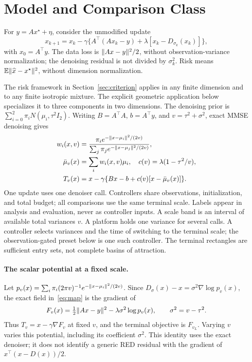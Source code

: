 \section{Model and Comparison Class}\label{sec:model}
For $y=Ax^\star+\eta$, consider the unmodified update
\begin{equation}\label{eq:red}
 x_{k+1}=x_k-\gamma\{A^\top(Ax_k-y)+\lambda[x_k-D_{\sigma_k}(x_k)]\},
\end{equation}
with $x_0=A^\top y$. The data loss is $\lVert Ax-y\rVert^2/2$, without observation-variance normalization; the denoising residual is not divided by $\sigma_k^2$. Risk means $\mathbb E\lVert\widehat x-x^\star\rVert^2$, without dimension normalization.

The risk framework in Section~\ref{sec:criterion} applies in any
finite dimension and to any finite isotropic mixture. The explicit
geometric application below specializes it to three components in two
dimensions. The denoising prior is $\sum_{i=0}^2\pi_iN(\mu_i,\tau^2I_2)$. Writing $B=A^\top A$, $b=A^\top y$, and $v=\tau^2+\sigma^2$, exact MMSE denoising gives
\begin{align}
w_i(x,v)&=\frac{\pi_i e^{-\lVert x-\mu_i\rVert^2/(2v)}}{\sum_j\pi_j e^{-\lVert x-\mu_j\rVert^2/(2v)}},\\
\bar\mu_v(x)&=\sum_iw_i(x,v)\mu_i,\quad c(v)=\lambda(1-\tau^2/v),\\
T_v(x)&=x-\gamma\{Bx-b+c(v)[x-\bar\mu_v(x)]\}.\label{eq:map}
\end{align}
One update uses one denoiser call. Controllers share observations, initialization, and total budget; all comparisons use the same terminal scale. Labels appear in analysis and evaluation, never as controller inputs. A scale band is an interval of available total variances $v$. A platform holds one variance for several calls. A controller selects variances and the time of switching to the terminal scale; the observation-gated preset below is one such controller. The terminal rectangles are sufficient entry sets, not complete basins of attraction.

\paragraph{The scalar potential at a fixed scale.}
Let $p_v(x)=\sum_i\pi_i(2\pi v)^{-1}e^{-\lVert x-\mu_i\rVert^2/(2v)}$. Since $D_\sigma(x)-x=\sigma^2\nabla\log p_v(x)$, the exact field in~\eqref{eq:map} is the gradient of
\begin{equation}\label{eq:potential}
F_v(x)=\tfrac12\lVert Ax-y\rVert^2-\lambda\sigma^2\log p_v(x),
\qquad\sigma^2=v-\tau^2.
\end{equation}
Thus $T_v=x-\gamma\nabla F_v$ at fixed $v$, and the terminal objective is $F_{v_L}$. Varying $v$ varies this potential, including its coefficient $\sigma^2$. This identity uses the exact denoiser; it does not identify a generic RED residual with the gradient of $x^\top(x-D(x))/2$.

